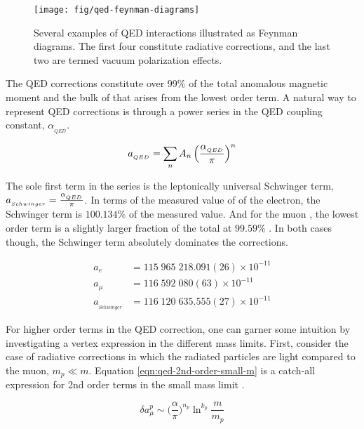 \begin{figure}
\label{fig:qed-feynman-diagrams}
\centering
\texttt{[image: fig/qed-feynman-diagrams]}
\caption{Several examples of QED interactions illustrated as Feynman diagrams.  The first four constitute radiative corrections, and the last two are termed vacuum polarization effects. }
\end{figure}

The QED corrections constitute over 99\% of the total anomalous magnetic moment and the bulk of that arises from the lowest order term.  A natural way to represent QED corrections is through a power series in the QED coupling constant, $\alpha_{_{QED}}$.

\begin{equation}
\label{eqn:qed-correction-series}
a_{_{QED}} = \sum_n{A_n \left(\frac{\alpha_{_{QED}}}{\pi} \right)^n}
\end{equation}

\noindent
The sole first term in the series is the leptonically universal Schwinger term, $a_{_{Schwinger}} = \frac{\alpha_{_{QED}}}{\pi}$.  In terms of the measured value of \gmtwo of the electron, the Schwinger term is $100.134\%$ of the measured value. And for the muon \gmtwo, the lowest order term is a slightly larger fraction of the total at $99.59\%$ \cite{codata}.  In both cases though, the Schwinger term absolutely dominates the corrections.

\begin{align*}
a_{e}   & = 115\;965\;218.091(26) \times 10^{-11} \\
a_{\mu} & = 116\;592\;080(63) \times 10^{-11} \\
a_{_{Schwinger}} & = 116\;120\;635.555(27) \times 10^{-11}
\end{align*}

For higher order terms in the QED correction, one can garner some intuition by investigating a vertex expression in the different mass limits.  First, consider the case of radiative corrections in which the radiated particles are light compared to the muon, $m_p \ll m$.  Equation \ref{eqn:qed-2nd-order-small-m} is a catch-all expression for 2nd order terms in the small mass limit \cite{the-muon-g-2}.

\begin{equation}
\label{eqn:qed-2nd-order-small-m}
\delta a_\mu^p \sim \big(\frac{\alpha}{\pi} \big)^{n_p} \ln^{k_p}\frac{m}{m_p}
\end{equation}

